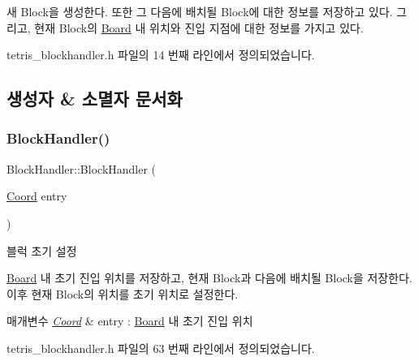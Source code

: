 새 Block을 생성한다. 또한 그 다음에 배치될 Block에 대한 정보를 저장하고 있다. 그리고, 현재 Block의 \mbox{\hyperlink{class_board}{Board}} 내 위치와 진입 지점에 대한 정보를 가지고 있다. 

tetris\+\_\+blockhandler.\+h 파일의 14 번째 라인에서 정의되었습니다.



\subsection{생성자 \& 소멸자 문서화}
\mbox{\label{class_block_handler_ae1955a1830df4398795c153ef54804fa}} 
\subsubsection{\texorpdfstring{Block\+Handler()}{BlockHandler()}}
{\footnotesize\ttfamily Block\+Handler\+::\+Block\+Handler (\begin{DoxyParamCaption}\item[{\mbox{\hyperlink{struct_coord}{Coord}}}]{entry }\end{DoxyParamCaption})\hspace{0.3cm}{\ttfamily [inline]}}



블럭 초기 설정 

\mbox{\hyperlink{class_board}{Board}} 내 초기 진입 위치를 저장하고, 현재 Block과 다음에 배치될 Block을 저장한다. 이후 현재 Block의 위치를 초기 위치로 설정한다. 
\begin{DoxyParams}{매개변수}
{\em \mbox{\hyperlink{struct_coord}{Coord}}} & entry \+: \mbox{\hyperlink{class_board}{Board}} 내 초기 진입 위치 \\
\hline
\end{DoxyParams}


tetris\+\_\+blockhandler.\+h 파일의 63 번째 라인에서 정의되었습니다.


